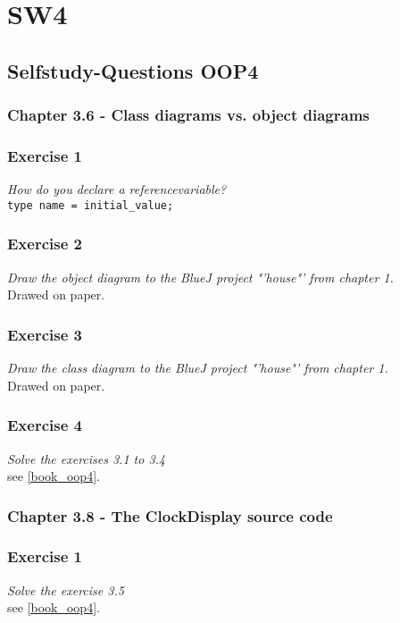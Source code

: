 \section{SW4}
\subsection{Selfstudy-Questions OOP4}

\subsubsection{Chapter 3.6 - Class diagrams vs. object diagrams}

\subsubsection*{Exercise 1}
\textit{How do you declare a referencevariable?}\\
\verb?type name = initial_value;?

\subsubsection*{Exercise 2}
\textit{Draw the object diagram to the BlueJ project "'house"' from 
chapter 1.}\\
Drawed on paper. 

\subsubsection*{Exercise 3}
\textit{Draw the class diagram to the BlueJ project "'house"' from
chapter 1.}\\
Drawed on paper. 

\subsubsection*{Exercise 4}
\textit{Solve the exercises 3.1 to 3.4}\\
see \ref{book_oop4}. 

\subsubsection{Chapter 3.8 - The ClockDisplay source code}

\subsubsection*{Exercise 1}
\textit{Solve the exercise 3.5}\\
see \ref{book_oop4}. 


